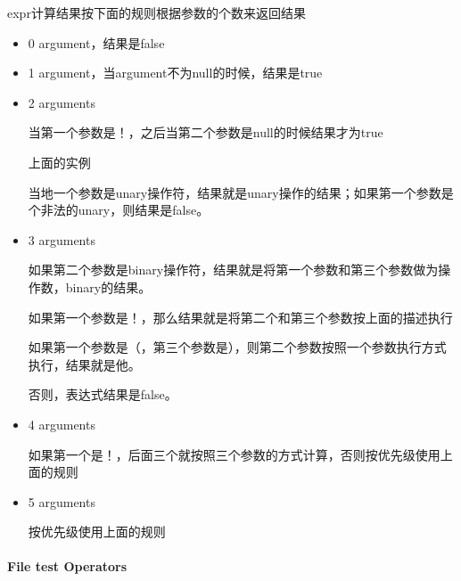expr计算结果按下面的规则根据参数的个数来返回结果
\begin{itemize}
\item 0 argument，结果是false
\item 1 argument，当argument不为null的时候，结果是true
\item 2 arguments

当第一个参数是！，之后当第二个参数是null的时候结果才为true

\begin{Command-Line}

上面的实例

\end{Command-Line}

当地一个参数是unary操作符，结果就是unary操作的结果；如果第一个参数是个非法的unary，则结果是false。


\item 3 arguments 

如果第二个参数是binary操作符，结果就是将第一个参数和第三个参数做为操作数，binary的结果。

如果第一个参数是！，那么结果就是将第二个和第三个参数按上面的描述执行

如果第一个参数是（，第三个参数是），则第二个参数按照一个参数执行方式执行，结果就是他。

否则，表达式结果是false。

\item 4 arguments

如果第一个是！，后面三个就按照三个参数的方式计算，否则按优先级使用上面的规则

\item 5 arguments

按优先级使用上面的规则

\end{itemize} 


\paragraph{File test Operators}

